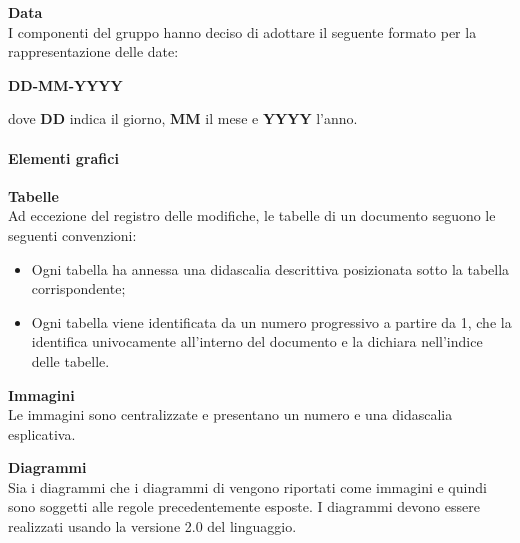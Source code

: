 \mbox{}

\textbf{Data}\\
I componenti del gruppo hanno deciso di adottare il seguente formato per la rappresentazione delle date:
\begin{center}
\textbf{DD-MM-YYYY}
\end{center}
dove \textbf{DD} indica il giorno, \textbf{MM} il mese e \textbf{YYYY} l'anno.

\paragraph{Elementi grafici}
\textbf{Tabelle}\\
Ad eccezione del registro delle modifiche, le tabelle di un documento seguono le seguenti convenzioni:
\begin{itemize}

	\item Ogni tabella ha annessa una didascalia descrittiva posizionata sotto la tabella corrispondente;
	
	\item Ogni tabella viene identificata da un numero progressivo a partire da 1, che la identifica univocamente all'interno del documento e la dichiara nell'indice delle tabelle.
\end{itemize}

\mbox{}

\textbf{Immagini}\\
Le immagini sono centralizzate e presentano un numero e una didascalia esplicativa.\\

\mbox{}

\textbf{Diagrammi}\\
Sia i diagrammi  che i diagrammi di  vengono riportati come immagini e quindi sono soggetti alle regole precedentemente esposte. I diagrammi  devono essere realizzati usando la versione 2.0 del linguaggio.


